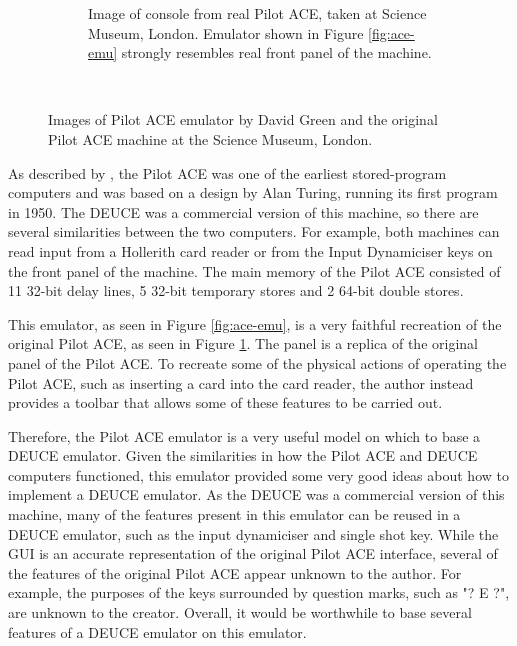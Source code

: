\documentclass{l4proj}
\begin{document}
\begin{figure}[h]
\begin{subfigure}[t]{0.45\textwidth}
		\caption{Image of console from real Pilot ACE, taken at Science Museum, London. Emulator shown in Figure \ref{fig:ace-emu} strongly resembles real front panel of the machine.}
		\label{fig:real-ace}
	\end{subfigure}
	~ %
	\caption{Images of Pilot ACE emulator by David Green and the original Pilot ACE machine at the Science Museum, London.}
	\label{fig:ace-comps}
\end{figure}
As described by \citet{VowelsAce05}, the Pilot ACE was one of the earliest stored-program computers and was based on a design by Alan Turing, running its first program in 1950. The DEUCE was a commercial version of this machine, so there are several similarities between the two computers. For example, both machines can read input from a Hollerith card reader or from the Input Dynamiciser keys on the front panel of the machine. The main memory of the Pilot ACE consisted of 11 32-bit delay lines, 5 32-bit temporary stores and 2 64-bit double stores.

This emulator, as seen in Figure \ref{fig:ace-emu}, is a very faithful recreation of the original Pilot ACE, as seen in Figure \ref{fig:real-ace}. The panel is a replica of the original panel of the Pilot ACE. To recreate some of the physical actions of operating the Pilot ACE, such as inserting a card into the card reader, the author instead provides a toolbar that allows some of these features to be carried out.

Therefore, the Pilot ACE emulator is a very useful model on which to base a DEUCE emulator. Given the similarities in how the Pilot ACE and DEUCE computers functioned, this emulator provided some very good ideas about how to implement a DEUCE emulator. As the DEUCE was a commercial version of this machine, many of the features present in this emulator can be reused in a DEUCE emulator, such as the input dynamiciser and single shot key. While the GUI is an accurate representation of the original Pilot ACE interface, several of the features of the original Pilot ACE appear unknown to the author. For example, the purposes of the keys surrounded by question marks, such as "? E ?", are unknown to the creator. Overall, it would be worthwhile to base several features of a DEUCE emulator on this emulator.
\end{document}
